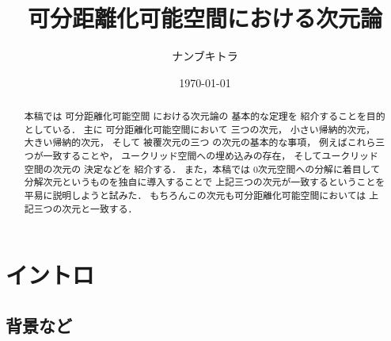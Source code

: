 \documentclass[leqno, a4paper, 12pt]{jsarticle}
\theoremstyle{plain}
\theoremstyle{definition}
\theoremstyle{remark}
\numberwithin{equation}{section}
\begin{document}
\title{
可分距離化可能空間における次元論
}



\author{ナンブキトラ}



			

\date{\today}





\maketitle
\begin{abstract}
本稿では
可分距離化可能空間
における次元論の
基本的な定理を
紹介することを目的としている．
主に
可分距離化可能空間において
三つの次元，
小さい帰納的次元，
大きい帰納的次元，
そして
被覆次元の三つ
の次元の基本的な事項，
例えばこれら三つが一致することや，
ユークリッド空間への埋め込みの存在，
そしてユークリッド空間の次元の
決定などを
紹介する．
また，本稿では
0次元空間への分解に着目して
分解次元というものを独自に導入することで
上記三つの次元が一致するということを
平易に説明しようと試みた．
もちろんこの次元も可分距離化可能空間においては
上記三つの次元と一致する．
\end{abstract}

\tableofcontents


\section{イントロ}\label{sec:intro}
\subsection{背景など}\label{subsec:backgrounds}
\end{document}
